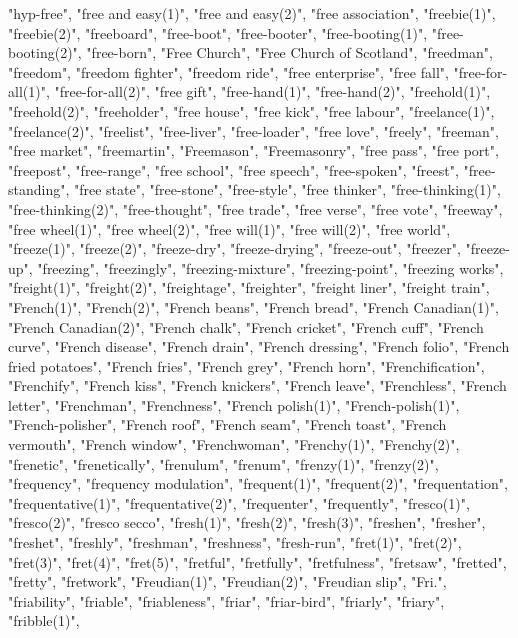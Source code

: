 "hyp-free",
"free and easy(1)",
"free and easy(2)",
"free association",
"freebie(1)",
"freebie(2)",
"freeboard",
"free-boot",
"free-booter",
"free-booting(1)",
"free-booting(2)",
"free-born",
"Free Church",
"Free Church of Scotland",
"freedman",
"freedom",
"freedom fighter",
"freedom ride",
"free enterprise",
"free fall",
"free-for-all(1)",
"free-for-all(2)",
"free gift",
"free-hand(1)",
"free-hand(2)",
"freehold(1)",
"freehold(2)",
"freeholder",
"free house",
"free kick",
"free labour",
"freelance(1)",
"freelance(2)",
"freelist",
"free-liver",
"free-loader",
"free love",
"freely",
"freeman",
"free market",
"freemartin",
"Freemason",
"Freemasonry",
"free pass",
"free port",
"freepost",
"free-range",
"free school",
"free speech",
"free-spoken",
"freest",
"free-standing",
"free state",
"free-stone",
"free-style",
"free thinker",
"free-thinking(1)",
"free-thinking(2)",
"free-thought",
"free trade",
"free verse",
"free vote",
"freeway",
"free wheel(1)",
"free wheel(2)",
"free will(1)",
"free will(2)",
"free world",
"freeze(1)",
"freeze(2)",
"freeze-dry",
"freeze-drying",
"freeze-out",
"freezer",
"freeze-up",
"freezing",
"freezingly",
"freezing-mixture",
"freezing-point",
"freezing works",
"freight(1)",
"freight(2)",
"freightage",
"freighter",
"freight liner",
"freight train",
"French(1)",
"French(2)",
"French beans",
"French bread",
"French Canadian(1)",
"French Canadian(2)",
"French chalk",
"French cricket",
"French cuff",
"French curve",
"French disease",
"French drain",
"French dressing",
"French folio",
"French fried potatoes",
"French fries",
"French grey",
"French horn",
"Frenchification",
"Frenchify",
"French kiss",
"French knickers",
"French leave",
"Frenchless",
"French letter",
"Frenchman",
"Frenchness",
"French polish(1)",
"French-polish(1)",
"French-polisher",
"French roof",
"French seam",
"French toast",
"French vermouth",
"French window",
"Frenchwoman",
"Frenchy(1)",
"Frenchy(2)",
"frenetic",
"frenetically",
"frenulum",
"frenum",
"frenzy(1)",
"frenzy(2)",
"frequency",
"frequency modulation",
"frequent(1)",
"frequent(2)",
"frequentation",
"frequentative(1)",
"frequentative(2)",
"frequenter",
"frequently",
"fresco(1)",
"fresco(2)",
"fresco secco",
"fresh(1)",
"fresh(2)",
"fresh(3)",
"freshen",
"fresher",
"freshet",
"freshly",
"freshman",
"freshness",
"fresh-run",
"fret(1)",
"fret(2)",
"fret(3)",
"fret(4)",
"fret(5)",
"fretful",
"fretfully",
"fretfulness",
"fretsaw",
"fretted",
"fretty",
"fretwork",
"Freudian(1)",
"Freudian(2)",
"Freudian slip",
"Fri.",
"friability",
"friable",
"friableness",
"friar",
"friar-bird",
"friarly",
"friary",
"fribble(1)",
